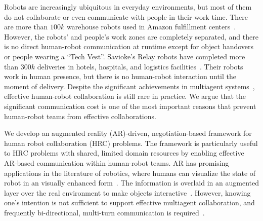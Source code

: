 \documentclass{article}
\begin{document}
Robots are increasingly ubiquitous in everyday environments, but most of them do not collaborate or even communicate with people in their work time. 
There are more than $100k$ warehouse robots used in Amazon fulfillment centers~\cite{wurman2008coordinating}. 
However, the robots' and people's work zones are completely separated, and there is no direct human-robot communication at runtime except for object handovers or people wearing a ``Tech Vest''. 
Savioke's Relay robots have completed more than $300k$ deliveries in hotels, hospitals, and logistics facilities~\cite{ivanov2017adoption}. 
Their robots work in human presence, but there is no human-robot interaction until the moment of delivery. 
Despite the significant achievements in multiagent systems~\cite{wooldridge2009introduction}, effective human-robot collaboration is still rare in practice. 
We argue that the significant communication cost is one of the most important reasons that prevent human-robot teams from effective collaborations. 


We develop an augmented reality (AR)-driven, negotiation-based framework for human robot collaboration (HRC) problems. 
The framework is particularly useful to HRC problems with shared, limited domain resources by enabling  effective AR-based communication within human-robot teams. 
AR has promising applications in the literature of robotics, where humans can visualize the state of robot in an visually enhanced form~\cite{green2007augmented}. 
The information is overlaid in an augmented layer over the real environment to make objects interactive~\cite{azuma2001recent}.
However, knowing one's intention is not sufficient to support effective multiagent collaboration, and frequently bi-directional, multi-turn communication is required~\cite{stone2000multiagent}. 
\end{document}
